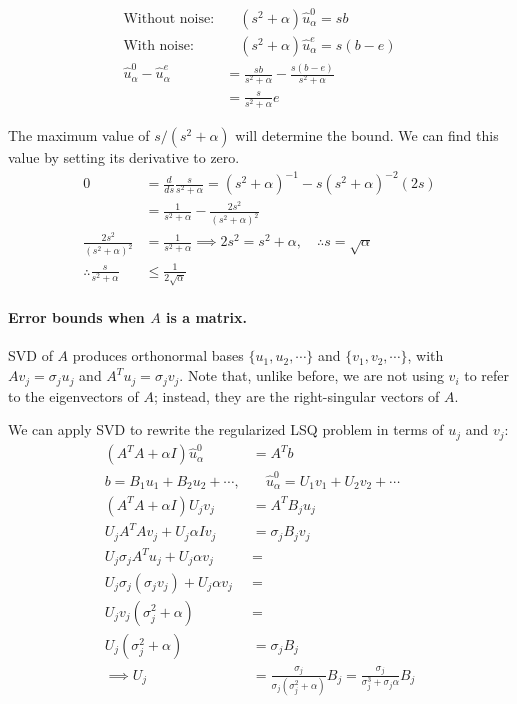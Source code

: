 \documentclass[]{article}
\begin{document}
\begin{align}
\textrm{Without noise:} &\quad (s^{2} + \alpha)\hat{u}_{\alpha}^{0} = sb \\
\textrm{With noise:} &\quad (s^{2} + \alpha)\hat{u}_{\alpha}^{e} = s(b-e) \\ 
\hat{u}_{\alpha}^{0} - \hat{u}_{\alpha}^{e} &= \frac{sb}{s^{2}+\alpha} - \frac{s(b-e)}{s^{2} + \alpha} \nonumber \\ 
&= \frac{s}{s^{2}+\alpha}e 
\end{align}
{The maximum value of $s/(s^{2}+\alpha)$ will determine the bound. We can find this value by setting its derivative to zero.
\begin{align}
0 &= \frac{d}{ds}\frac{s}{s^{2}+\alpha} = (s^{2}+\alpha)^{-1} - s(s^{2}+\alpha)^{-2}(2s) \nonumber \\
&= \frac{1}{s^{2}+\alpha} - \frac{2s^{2}}{(s^{2}+\alpha)^{2}} \nonumber \\
\frac{2s^{2}}{(s^{2}+\alpha)^{2}} &= \frac{1}{s^{2}+\alpha} \implies 2s^{2} = s^{2} + \alpha, \quad \therefore s = \sqrt{\alpha} \nonumber \\
\therefore \frac{s}{s^{2}+\alpha} &\leq  \frac{1}{2\sqrt{\alpha}} \label{errorbound_scalar_withnoise} 
\end{align}

\paragraph{Error bounds when $A$ is a matrix. \\}
SVD of $A$ produces orthonormal bases $\{u_{1}, u_{2}, \dotsm \}$ and $\{v_{1}, v_{2}, \dotsm \}$, with $Av_{j} = \sigma_{j}u_{j}$ and $A^{T}u_{j} = \sigma_{j}v_{j}$. Note that, unlike before, we are not using $v_i$ to refer to the eigenvectors of $A$; instead, they are the right-singular vectors of $A$. 

We can apply SVD to rewrite the regularized LSQ problem in terms of $u_{j}$ and $v_{j}$:
\begin{align}
(A^{T}A + \alpha I)\hat{u}^{0}_{\alpha} &= A^{T}b \nonumber \\
b = B_{1}u_{1} + B_{2}u_{2} + \dotsm, &\quad \hat{u}^{0}_{\alpha} = U_{1}v_{1} + U_{2}v_{2} + \dotsm \nonumber \\ 
(A^{T}A + \alpha I)U_{j}v_{j} &= A^{T}B_{j}u_{j}  \\
U_{j} A^{T}A v_{j} + U_{j} \alpha I v_{j} &= \sigma_{j}B_{j}v_{j} \nonumber \\
U_{j} \sigma_{j} A^{T} u_{j} + U_{j} \alpha v_{j} &=  \nonumber \\
U_{j} \sigma_{j} (\sigma_{j}v_{j}) + U_{j} \alpha v_{j} &= \nonumber \\
U_{j}v_{j}(\sigma_{j}^{2}+\alpha) &= \nonumber \\
U_{j}(\sigma_{j}^{2}+\alpha) &= \sigma_{j}B_{j} \\
\implies U_{j} &= \frac{\sigma_{j}}{\sigma_{j}(\sigma_{j}^{2}+\alpha)}B_{j} = \frac{\sigma_{j}}{\sigma_{j}^{3}+\sigma_{j}\alpha}B_{j} \label{errorbound_matrix_nonoise}
\end{align}

}
\end{document}
